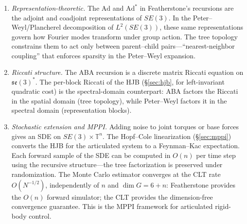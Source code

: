 \documentclass[12pt]{amsart}
\theoremstyle{definition}
\theoremstyle{remark}
\newcommand{\bT}{\mathbb{T}}
\begin{document}
\begin{enumerate}[label=(\roman*)]
\item \emph{Representation-theoretic.}
The $\mathrm{Ad}$ and $\mathrm{Ad}^*$ in Featherstone's recursions are the
adjoint and coadjoint representations of $SE(3)$.
In the Peter--Weyl/Plancherel decomposition of $L^2(SE(3))$, these same
representations govern how Fourier modes transform under group action.
The tree topology constrains them to act only between parent--child
pairs---``nearest-neighbor coupling'' that enforces sparsity in the
Peter--Weyl expansion.

\item \emph{Riccati structure.}
The ABA recursion is a discrete matrix Riccati equation on
$\mathfrak{se}(3)^*$.
The per-block Riccati of the HJB (\S\ref{sec:hjb}, for left-invariant quadratic cost)
is the spectral-domain counterpart: ABA factors the Riccati in the spatial
domain (tree topology), while Peter--Weyl factors it in the spectral domain
(representation blocks).

\item \emph{Stochastic extension and MPPI.}
Adding noise to joint torques or base forces gives an SDE on
$SE(3) \times \bT^n$.
The Hopf--Cole linearization (\S\ref{sec:mppi}) converts the HJB for the
articulated system to a Feynman--Kac expectation.
Each forward sample of the SDE can be computed in $O(n)$ per time step using
the recursive structure---the tree factorization is preserved under
randomization.
The Monte Carlo estimator converges at the CLT rate $O(N^{-1/2})$,
independently of $n$ and $\dim G = 6 + n$:
Featherstone provides the $O(n)$ forward simulator; the CLT provides the
dimension-free convergence guarantee.
This is the MPPI framework for articulated rigid-body control.
\end{enumerate}
\end{document}
